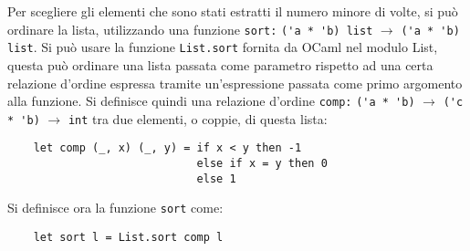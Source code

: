 \documentclass{article}
\numberwithin{equation}{subsection}
\begin{document}
Per scegliere gli elementi che sono stati estratti il numero minore di volte, si può ordinare la lista, utilizzando una funzione \verb|sort:| \verb|('a * 'b) list| $\rightarrow$ \verb|('a * 'b) list|. Si può usare la funzione \verb|List.sort| fornita da OCaml nel modulo List, questa può ordinare una lista passata come parametro rispetto ad una certa relazione d'ordine espressa tramite un'espressione passata come primo argomento alla funzione. Si definisce quindi una relazione d'ordine \verb|comp:| \verb|('a * 'b)| $\rightarrow$ \verb|('c * 'b)| $\rightarrow$ \verb|int| tra due elementi, o coppie, di questa lista:
\begin{verbatim}
    let comp (_, x) (_, y) = if x < y then -1
                             else if x = y then 0
                             else 1
\end{verbatim}
Si definisce ora la funzione \verb|sort| come:
\begin{verbatim}
    let sort l = List.sort comp l
\end{verbatim}
\end{document}
